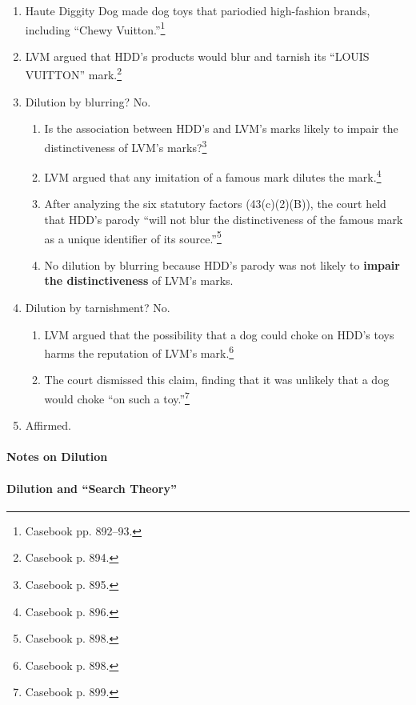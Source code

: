 \begin{enumerate}
    \item Haute Diggity Dog made dog toys that pariodied high-fashion brands, 
    including ``Chewy Vuitton.''\footnote{Casebook pp. 892--93.}
    \item LVM argued that HDD's products would blur and tarnish its ``LOUIS 
    VUITTON'' mark.\footnote{Casebook p. 894.}
    \item Dilution by blurring? No.
    \begin{enumerate}
        \item Is the association between HDD's and LVM's marks likely to 
        impair the distinctiveness of LVM's marks?\footnote{Casebook p. 895.}
        \item LVM argued that any imitation of a famous mark dilutes the 
        mark.\footnote{Casebook p. 896.}
        \item After analyzing the six statutory factors (43(c)(2)(B)), the 
        court held that HDD's parody ``will not blur the distinctiveness of 
        the famous mark as a unique identifier of its 
        source.''\footnote{Casebook p. 898.}
        \item No dilution by blurring because HDD's parody was not likely to 
        \textbf{impair the distinctiveness} of LVM's marks.
    \end{enumerate}
    \item Dilution by tarnishment? No.
    \begin{enumerate}
        \item LVM argued that the possibility that a dog could choke on HDD's 
        toys harms the reputation of LVM's mark.\footnote{Casebook p. 898.}
        \item The court dismissed this claim, finding that it was unlikely 
        that a dog would choke ``on such a toy.''\footnote{Casebook p. 899.}
    \end{enumerate}
    \item Affirmed.
\end{enumerate}

\paragraph{Notes on Dilution}


\paragraph{Dilution and ``Search Theory''}

